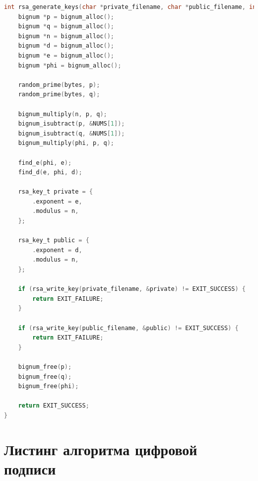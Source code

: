 \begin{lstlisting}[language=C, label=lst:rsa_keygen, caption={Реализация алгоритма RSA (генерация ключей}]
int rsa_generate_keys(char *private_filename, char *public_filename, int bytes) {
    bignum *p = bignum_alloc();
    bignum *q = bignum_alloc();
    bignum *n = bignum_alloc();
    bignum *d = bignum_alloc();
    bignum *e = bignum_alloc();
    bignum *phi = bignum_alloc();

    random_prime(bytes, p);
    random_prime(bytes, q);

    bignum_multiply(n, p, q);
    bignum_isubtract(p, &NUMS[1]);
    bignum_isubtract(q, &NUMS[1]);
    bignum_multiply(phi, p, q);

    find_e(phi, e);
    find_d(e, phi, d);

    rsa_key_t private = {
        .exponent = e,
        .modulus = n,
    };

    rsa_key_t public = {
        .exponent = d,
        .modulus = n,
    };

    if (rsa_write_key(private_filename, &private) != EXIT_SUCCESS) {
        return EXIT_FAILURE;
    }

    if (rsa_write_key(public_filename, &public) != EXIT_SUCCESS) {
        return EXIT_FAILURE;
    }

    bignum_free(p);
    bignum_free(q);
    bignum_free(phi);

    return EXIT_SUCCESS;
}
\end{lstlisting}


\section{Листинг алгоритма цифровой подписи}

